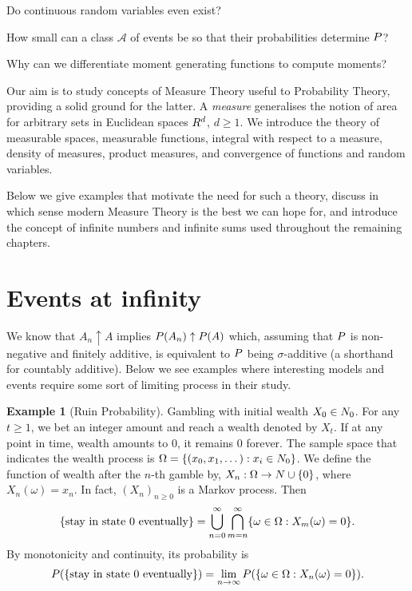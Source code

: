 \documentclass[
]{book}
\let\mathbb\relax %
\newcommand{\N}{\mathbb{N}}
\newcommand{\Pb}{\mathbb{P}}
\newcommand{\cA}{\mathcal{A}}
\renewcommand*{\geq}{\geqslant}
\theoremstyle{definition}
\theoremstyle{definition}
\newtheorem{example}{Example}[chapter]
\theoremstyle{definition}
\theoremstyle{definition}
\theoremstyle{remark}
\begin{document}
Do continuous random variables even exist?

How small can a class \(\cA\) of events be so that their probabilities
determine \(\Pb\)?

Why can we differentiate moment generating functions to compute moments?

Our aim is to study concepts of Measure Theory useful to Probability
Theory, providing a solid ground for the latter. A \emph{measure} generalises
the notion of area for arbitrary sets in Euclidean spaces
\(\mathbb{R}^d\), \(d \geq 1\). We introduce the theory of measurable
spaces, measurable functions, integral with respect to a measure,
density of measures, product measures, and convergence of functions and
random variables.

Below we give examples that motivate the need for such a theory, discuss
in which sense modern Measure Theory is the best we can hope for, and
introduce the concept of infinite numbers and infinite sums used
throughout the remaining chapters.

\hypertarget{sub:eventsinfty}{%
\section{Events at infinity}\label{sub:eventsinfty}}

We know that \(A_n \uparrow A\) implies \(\Pb(A_n) \uparrow \Pb(A)\) which,
assuming that \(\Pb\) is non-negative and finitely additive, is equivalent
to \(\Pb\) being \(\sigma\)-additive (a shorthand for countably additive).
Below we see examples where interesting models and events require some
sort of limiting process in their study.

\begin{example}[Ruin Probability]
Gambling with initial wealth \(X_0 \in \mathbb{N}_0\). For any \(t \geq 1\),
we bet an integer amount and reach a wealth denoted by \(X_t\). If at any
point in time, wealth amounts to \(0\), it remains \(0\) forever. The sample
space that indicates the wealth process is
\(\Omega = \{(x_0, x_1, \dots): x_i \in \N_0 \}\). We define the function
of wealth after the \(n\)-th gamble by,
\(X_n : \Omega \to \mathbb{N}\cup\{0\}\), where \(X_n(\omega) = x_n\). In
fact, \((X_n)_{n \geq 0}\) is a Markov process. Then
\[\{ \text{stay in state $ 0 $ eventually} \}
= \bigcup_{n=0}^{\infty}\bigcap_{m = n}^{\infty}\{\omega \in \Omega: X_m(\omega) = 0\}.\]
By monotonicity and continuity, its probability is \[\Pb(
\{ \text{stay in state $ 0 $ eventually} \}
)
=
\lim_{n\to\infty}
\Pb(\{\omega \in \Omega: X_n(\omega) = 0\})
 .\]
\end{example}
\end{document}
